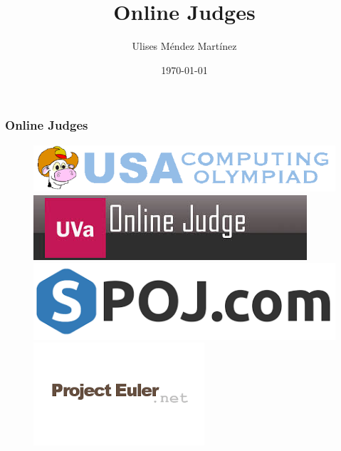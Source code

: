 \documentclass{beamer}
\title[Online Judges]{Online Judges} %
\author{Ulises M\'endez Mart\'{i}nez} %
\institute[UTM] %
{
Algorist Weekly Talks \\ %
\medskip
\textit{ulisesmdzmtz@gmail.com} %
}
\date{\today} %
\begin{document}
\begin{frame}
\titlepage %
\end{frame}


\begin{frame}
	\frametitle{Online Judges}
	\begin{figure}[!htb]
	  \includegraphics[width=\linewidth]{images/judges/usaco}%
     \endminipage\hfill
      \includegraphics[width=\linewidth]{images/judges/uva}%
     \endminipage\hfill
      \includegraphics[width=\linewidth]{images/judges/spoj}%
     \endminipage\hfill
      \includegraphics[width=\linewidth]{images/judges/projecteuler}%

\end{figure}
\end{frame}
\end{document}

